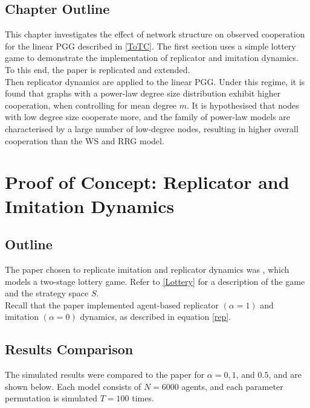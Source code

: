 \subsection{Chapter Outline}
This chapter investigates the effect of network structure on observed cooperation for the linear PGG described in \ref{ToTC}. The first section uses a simple lottery game to demonstrate the implementation of replicator and imitation dynamics. To this end, the paper \cite{RN30} is replicated and extended. \\

Then replicator dynamics are applied to the linear PGG. Under this regime, it is found that graphs with a power-law degree size distribution exhibit higher cooperation, when controlling for mean degree $m$. It is hypothesised that nodes with low degree size cooperate more, and the family of power-law models are characterised by a large number of low-degree nodes, resulting in higher overall cooperation than the WS and RRG model. \\
\section{Proof of Concept: Replicator and Imitation Dynamics} \label{Lottery_Me}
\subsection{Outline}
The paper chosen to replicate imitation and replicator dynamics was \cite{RN30}, which models a two-stage lottery game. Refer to \ref{Lottery} for a description of the game and the strategy space $S$. \\

Recall that the paper implemented agent-based replicator $(\alpha = 1)$ and imitation $(\alpha = 0)$ dynamics, as described in equation \eqref{rep}.

\subsection{Results Comparison}
The simulated results were compared to the paper for $\alpha = 0, 1$, and $ 0.5$, and are shown below. Each model consists of $N=6000$ agents, and each parameter permutation is simulated $T=100$ times. \\

